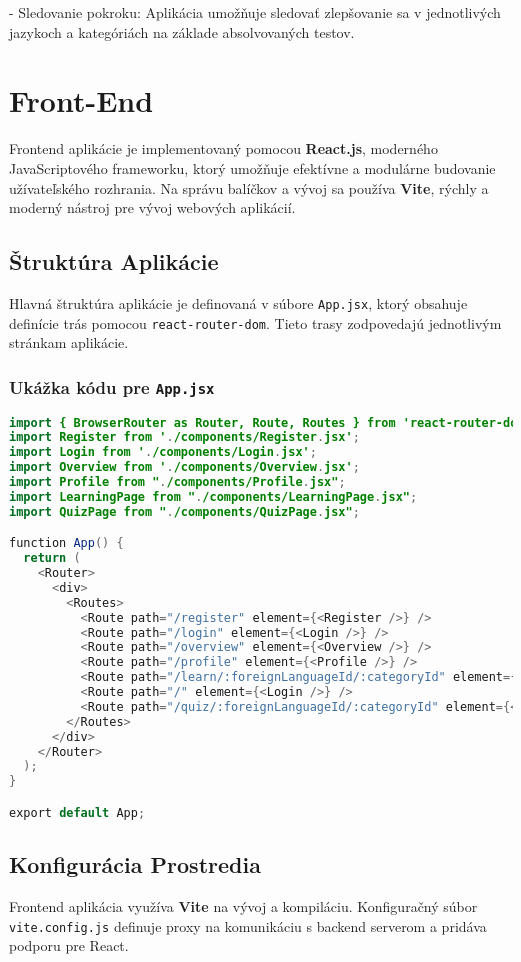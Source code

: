 \documentclass{article}
\begin{document}
- Sledovanie pokroku: Aplikácia umožňuje sledovať zlepšovanie sa v jednotlivých jazykoch a kategóriách na základe absolvovaných testov.

\newpage
\section{Front-End}
Frontend aplikácie je implementovaný pomocou \textbf{React.js}, moderného JavaScriptového frameworku, ktorý umožňuje efektívne a modulárne budovanie užívateľského rozhrania. Na správu balíčkov a vývoj sa používa \textbf{Vite}, rýchly a moderný nástroj pre vývoj webových aplikácií.


\subsection{Štruktúra Aplikácie}
Hlavná štruktúra aplikácie je definovaná v súbore \texttt{App.jsx}, ktorý obsahuje definície trás pomocou \texttt{react-router-dom}. Tieto trasy zodpovedajú jednotlivým stránkam aplikácie.

\subsubsection{Ukážka kódu pre \texttt{App.jsx}}
\begin{lstlisting}[language=java, caption={Definícia trás v \texttt{App.jsx}}]
import { BrowserRouter as Router, Route, Routes } from 'react-router-dom';
import Register from './components/Register.jsx';
import Login from './components/Login.jsx';
import Overview from './components/Overview.jsx';
import Profile from "./components/Profile.jsx";
import LearningPage from "./components/LearningPage.jsx";
import QuizPage from "./components/QuizPage.jsx";

function App() {
  return (
    <Router>
      <div>
        <Routes>
          <Route path="/register" element={<Register />} />
          <Route path="/login" element={<Login />} />
          <Route path="/overview" element={<Overview />} />
          <Route path="/profile" element={<Profile />} />
          <Route path="/learn/:foreignLanguageId/:categoryId" element={<LearningPage />} />
          <Route path="/" element={<Login />} />
          <Route path="/quiz/:foreignLanguageId/:categoryId" element={<QuizPage />} />
        </Routes>
      </div>
    </Router>
  );
}

export default App;
\end{lstlisting}

\subsection{Konfigurácia Prostredia}
Frontend aplikácia využíva \textbf{Vite} na vývoj a kompiláciu. Konfiguračný súbor \texttt{vite.config.js} definuje proxy na komunikáciu s backend serverom a pridáva podporu pre React.
\end{document}
